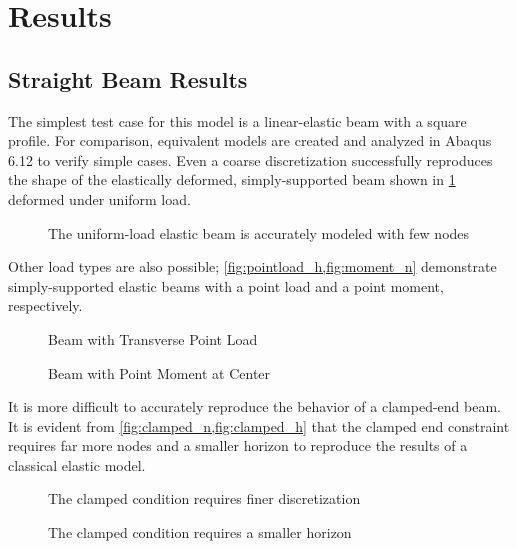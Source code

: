 \section{Results}
\label{sec:Results}
\FloatBarrier
\subsection{Straight Beam Results}
The simplest test case for this model is a linear-elastic beam with a square profile.
For comparison, equivalent models are created and analyzed in Abaqus 6.12 to verify simple cases.
Even a coarse discretization successfully reproduces the shape of the elastically deformed, simply-supported beam shown  in \cref{fig:elastic_g2000} deformed under uniform load.
%
\begin{figure}[htbp]
  \centering
  \resizebox{0.6\linewidth}{!}{}
  \caption{The uniform-load elastic beam is accurately modeled with few nodes}
  \label{fig:elastic_g2000}
\end{figure}
%
Other load types are also possible; \cref{fig:pointload_h,fig:moment_n} demonstrate simply-supported elastic beams with a point load and a point moment, respectively.
%
\begin{figure}[htbp]
  \centering
  \resizebox{0.6\linewidth}{!}{}
  \caption{Beam with Transverse Point Load}
  \label{fig:pointload_h}
\end{figure}
%
%
\begin{figure}[htbp]
  \centering
  \resizebox{0.6\linewidth}{!}{}
  \caption{Beam with Point Moment at Center}
  \label{fig:moment_n}
\end{figure}
%

It is more difficult to accurately reproduce the behavior of a clamped-end beam.
It is evident from \cref{fig:clamped_n,fig:clamped_h} that the clamped end constraint requires far more nodes and a smaller horizon to reproduce the results of a classical elastic model.
%
\begin{figure}[htbp]
  \centering
  \resizebox{0.6\linewidth}{!}{}
  \caption{The clamped condition requires finer discretization}
  \label{fig:clamped_n}
\end{figure}
%
%
\begin{figure}[htbp]
  \centering
  \resizebox{0.6\linewidth}{!}{}
  \caption{The clamped condition requires a smaller horizon}
  \label{fig:clamped_h}
\end{figure}
%


